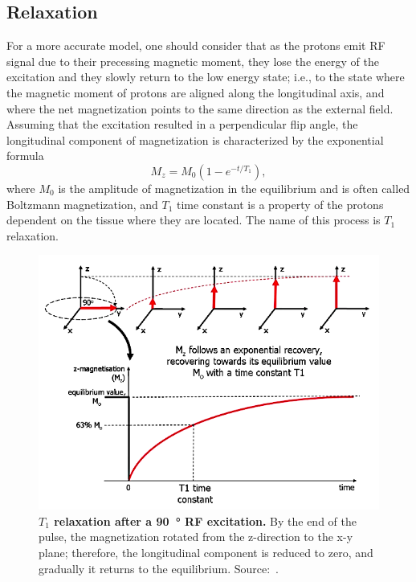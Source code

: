 \subsection{Relaxation}
For a more accurate model, one should consider that as the protons emit RF signal due to their precessing magnetic moment, they lose the energy of the excitation and they slowly return to the low energy state; i.e., to the state where the magnetic moment of protons are aligned along the longitudinal axis, and where the net magnetization points to the same direction as the external field. Assuming that the excitation resulted in a perpendicular flip angle, the longitudinal component of magnetization is characterized by the exponential formula
\[M_z = M_0 (1 - e^{-t/T_1}),\]
where $M_0$ is the amplitude of magnetization in the equilibrium and is often called Boltzmann magnetization, and $T_1$ time constant is a property of the protons dependent on the tissue where they are located. The name of this process is $T_1$ relaxation.

\begin{figure}[tb]
    \centering
    \includegraphics[width=0.8\linewidth]{images/T1_relaxation.png}
    \caption{\textbf{$T_1$ relaxation after a \SI{90}{\degree} RF excitation.} By the end of the pulse, the magnetization rotated from the z-direction to the x-y plane; therefore, the longitudinal component is reduced to zero, and gradually it returns to the equilibrium. Source:~\cite{ridgway_cardiovascular_2010}.}
    \label{fig:T1_relaxation}
\end{figure}

